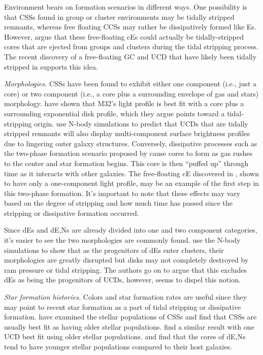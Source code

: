 \documentclass[iop,apj]{emulateapj}
\begin{document}
Environment bears on formation scenarios in different ways. One possibility is that CSSs found in group or cluster environments may be tidally stripped remnants, whereas free floating CCSs may rather be dissipatively formed like Es. However, \citet{Chilingarian2015} argue that these free-floating cEs could actually be tidally-stripped cores that are ejected from groups and clusters during the tidal stripping process. The recent discovery of a free-floating GC and UCD that have likely been tidally stripped in \citet{Sandoval2015} supports this idea.

\textit{Morphologies.} CSSs have been found to exhibit either one component (i.e., just a core) or two component (i.e., a core plus a surrounding envelope of gas and stars) morphology. \citet{Graham2002} have shown that M32's light profile is best fit with a core plus a surrounding exponential disk profile, which they argue points toward a tidal-stripping origin. \citet{Pfeffer2013} use N-body simulations to predict that UCDs that are tidally stripped remnants will also display multi-component surface brightness profiles due to lingering outer galaxy structures. Conversely, dissipative processes such as the two-phase formation scenario proposed by \citet{Oser2010} cause cores to form as gas rushes to the center and star formation begins. This core is then ``puffed up'' through time as it interacts with other galaxies. The free-floating cE discovered in \citet{Huxor2013}, shown to have only a one-component light profile, may be an example of the first step in this two-phase formation. It's important to note that these effects may vary based on the degree of stripping and how much time has passed since the stripping or dissipative formation occurred.

Since dEs and dE,Ns are already divided into one and two component categories, it's easier to see the two morphologies are commonly found. \citet{Mastropietro2005a} use the N-body simulations to show that as the progenitors of dEs enter clusters, their morphologies are greatly disrupted but disks may not completely destroyed by ram pressure or tidal stripping. The authors go on to  argue that this excludes dEs as being the progenitors of UCDs, however, \citet{Pfeffer2013} seems to dispel this notion. 

\textit{Star formation histories.} 
Colors and star formation rates are useful since they may point to recent star formation as a part of tidal stripping or dissipative formation. \citet{Drinkwater2000} have examined the stellar populations of CSSs and find that CSSs are usually best fit as having older stellar populations. \citet{Norris2011} find a similar result with one UCD best fit using older stellar populations. \citet{Drinkwater2000} and \citet{Ferrarese2006} find that the cores of dE,Ns tend to have younger stellar populations compared to their host galaxies. 
\end{document}
